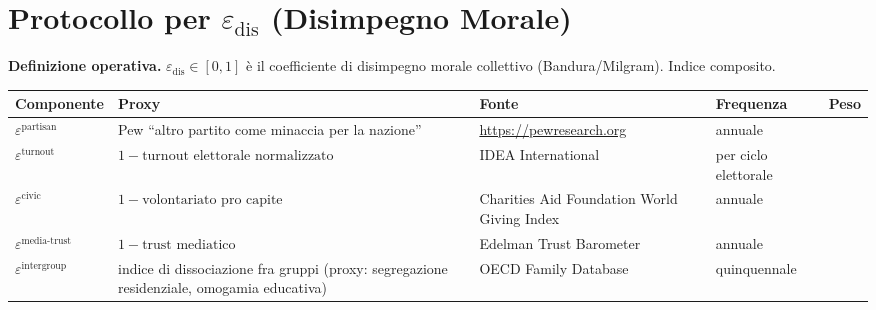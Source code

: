 \section{\texorpdfstring{Protocollo per \(\varepsilon_{\text{dis}}\)
(Disimpegno
Morale)}{Protocollo per \textbackslash varepsilon\_\{\textbackslash text\{dis\}\} (Disimpegno Morale)}}\label{protocollo-per-varepsilon_textdis-disimpegno-morale}

\Hypoth{} \textbf{Definizione operativa.}
\(\varepsilon_{\text{dis}} \in [0,1]\) è il coefficiente di disimpegno
morale collettivo (Bandura/Milgram). Indice composito.

{\def\LTcaptype{none} %
{\small\begin{longtable}[]{@{}
  >{\raggedright\arraybackslash}p{}
  >{\raggedright\arraybackslash}p{}
  >{\raggedright\arraybackslash}p{}
  >{\raggedright\arraybackslash}p{}
  >{\raggedright\arraybackslash}p{}@{}}
\toprule\noalign{}
\begin{minipage}[b]{\linewidth}\raggedright
Componente
\end{minipage} & \begin{minipage}[b]{\linewidth}\raggedright
Proxy
\end{minipage} & \begin{minipage}[b]{\linewidth}\raggedright
Fonte
\end{minipage} & \begin{minipage}[b]{\linewidth}\raggedright
Frequenza
\end{minipage} & \begin{minipage}[b]{\linewidth}\raggedright
Peso
\end{minipage} \\
\midrule\noalign{}
\endhead
\bottomrule\noalign{}
\endlastfoot
\(\varepsilon^{\text{partisan}}\) & Pew ``altro partito come minaccia
per la nazione'' & \url{https://pewresearch.org} & annuale & 0.30 \\
\(\varepsilon^{\text{turnout}}\) &
\(1 - \text{turnout elettorale normalizzato}\) & IDEA International &
per ciclo elettorale & 0.20 \\
\(\varepsilon^{\text{civic}}\) & \(1 - \text{volontariato pro capite}\)
& Charities Aid Foundation World Giving Index & annuale & 0.20 \\
\(\varepsilon^{\text{media-trust}}\) & \(1 - \text{trust mediatico}\) &
Edelman Trust Barometer & annuale & 0.15 \\
\(\varepsilon^{\text{intergroup}}\) & indice di dissociazione fra gruppi
(proxy: segregazione residenziale, omogamia educativa) & OECD Family
Database & quinquennale & 0.15 \\
\end{longtable}}
}

